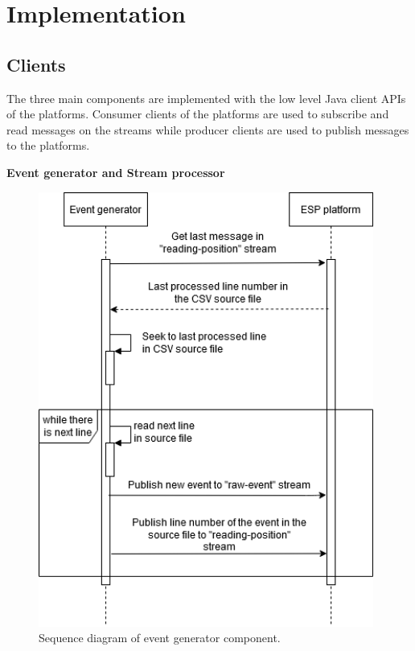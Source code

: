 \section{Implementation}
\subsection{Clients}
The three main components are implemented with the low level Java client APIs of the platforms. Consumer clients of the platforms are used to subscribe and read messages on the streams while producer clients are used to publish messages to the platforms.

\textbf{Event generator and Stream processor}
\begin{figure}[h!]
	\centering
	\includegraphics[width=11cm]{images/implement-event-generator.png}
	\caption{Sequence diagram of event generator component.}
	\label{fig:implementeventgenerator}
\end{figure}



